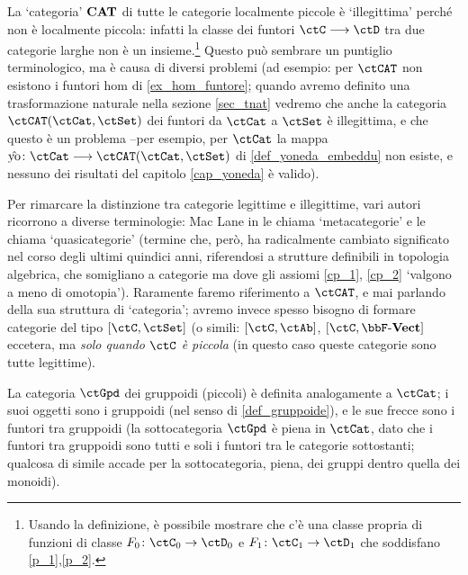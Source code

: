 \begin{remark}
 La `categoria' \(\mathbf{CAT}\) di tutte le categorie localmente piccole è `illegittima' perché non è localmente piccola: infatti la classe dei funtori \(\ctC \fun\ctD\) tra due categorie larghe non è un insieme.\footnote{Usando la definizione, è possibile mostrare che c'è una classe propria di funzioni di classe \(F_0 \colon \ctC_0 \to \ctD_0\) e \(F_1 \colon \ctC_1 \to \ctD_1\) che soddisfano \ref{p_1},\ref{p_2}.} Questo può sembrare un puntiglio terminologico, ma è causa di diversi problemi (ad esempio: per \(\ctCAT\) non esistono i funtori hom di \ref{ex_hom_funtore}; quando avremo definito una trasformazione naturale nella sezione \ref{sec_tnat} vedremo che anche la categoria \(\Hom{\ctCAT}(\ctCat,\ctSet)\) dei funtori da \(\ctCat\) a \(\ctSet\) è illegittima, e che questo è un problema --per esempio, per \(\ctCat\) la mappa \(\yon \colon \ctCat \fun \Hom{\ctCAT}(\ctCat,\ctSet)\) di \ref{def_yoneda_embeddu} non esiste, e nessuno dei risultati del capitolo \ref{cap_yoneda} è valido).

 Per rimarcare la distinzione tra categorie legittime e illegittime, vari autori ricorrono a diverse terminologie: Mac Lane in \cite{working-categories} le chiama `metacategorie' e \cite{acc} le chiama `quasicategorie' (termine che, però, ha radicalmente cambiato significato nel corso degli ultimi quindici anni, riferendosi a strutture definibili in topologia algebrica, che somigliano a categorie ma dove gli assiomi \ref{cp_1}, \ref{cp_2} `valgono a meno di omotopia'). Raramente faremo riferimento a \(\ctCAT\), e mai parlando della sua struttura di `categoria'; avremo invece spesso bisogno di formare categorie del tipo \([\ctC,\ctSet]\) (o simili: \([\ctC,\ctAb]\), \([\ctC,\ctVect]\) eccetera, ma \emph{solo quando \(\ctC\) è piccola} (in questo caso queste categorie sono tutte legittime).
\end{remark}
\begin{definition}\label{ex_cat_gruppoidi}
 La categoria \(\ctGpd\) dei gruppoidi (piccoli) è definita analogamente a \(\ctCat\); i suoi oggetti sono i gruppoidi (nel senso di \ref{def_gruppoide}),	e le sue frecce sono i funtori tra gruppoidi (la sottocategoria \(\ctGpd\) è piena in \(\ctCat\), dato che i funtori tra gruppoidi sono tutti e soli i funtori  tra le categorie sottostanti; qualcosa di simile accade per la sottocategoria, piena, dei gruppi dentro quella dei monoidi).
\end{definition}
